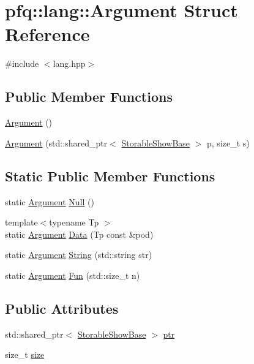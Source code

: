 \hypertarget{structpfq_1_1lang_1_1Argument}{\section{pfq\+:\+:lang\+:\+:Argument Struct Reference}
\label{structpfq_1_1lang_1_1Argument}
}


{\ttfamily \#include $<$lang.\+hpp$>$}

\subsection*{Public Member Functions}
\begin{DoxyCompactItemize}
\item 
\hyperlink{structpfq_1_1lang_1_1Argument_afaf71c8c26efb0217437393eadf43d9e}{Argument} ()
\item 
\hyperlink{structpfq_1_1lang_1_1Argument_aef6639663214dd391f337620b06b23c9}{Argument} (std\+::shared\+\_\+ptr$<$ \hyperlink{structpfq_1_1lang_1_1StorableShowBase}{Storable\+Show\+Base} $>$ p, size\+\_\+t s)
\end{DoxyCompactItemize}
\subsection*{Static Public Member Functions}
\begin{DoxyCompactItemize}
\item 
static \hyperlink{structpfq_1_1lang_1_1Argument}{Argument} \hyperlink{structpfq_1_1lang_1_1Argument_a47b27b590b495ac9e990d850f3052aad}{Null} ()
\item 
{\footnotesize template$<$typename Tp $>$ }\\static \hyperlink{structpfq_1_1lang_1_1Argument}{Argument} \hyperlink{structpfq_1_1lang_1_1Argument_ae9ded6ceab4dd43be420763bed00f2c3}{Data} (Tp const \&pod)
\item 
static \hyperlink{structpfq_1_1lang_1_1Argument}{Argument} \hyperlink{structpfq_1_1lang_1_1Argument_aba384bb2905edc62d6700a0d61f6b05b}{String} (std\+::string str)
\item 
static \hyperlink{structpfq_1_1lang_1_1Argument}{Argument} \hyperlink{structpfq_1_1lang_1_1Argument_a774e93098c8bc9f3472facd7ddeb08ca}{Fun} (std\+::size\+\_\+t n)
\end{DoxyCompactItemize}
\subsection*{Public Attributes}
\begin{DoxyCompactItemize}
\item 
std\+::shared\+\_\+ptr$<$ \hyperlink{structpfq_1_1lang_1_1StorableShowBase}{Storable\+Show\+Base} $>$ \hyperlink{structpfq_1_1lang_1_1Argument_a74137962d82bf5a018d684c04149e446}{ptr}
\item 
size\+\_\+t \hyperlink{structpfq_1_1lang_1_1Argument_a0ce45c4283dc6a97dbf142cb9de211df}{size}
\end{DoxyCompactItemize}


